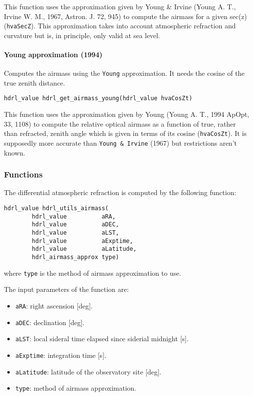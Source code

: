 This function uses the approximation given by Young \& Irvine (Young A. T., Irvine W. M., 1967, Astron. J. 72, 945) to compute the airmass for a given sec(z) (\verb+hvaSecZ+). 
This approximation takes into account atmospheric refraction and curvature but is, in principle, only valid at sea level.
  
  
\paragraph{Young approximation (1994)}

Computes the airmass using the \verb+Young+ approximation. It needs the cosine of the true zenith distance.

\begin{lstlisting}
hdrl_value hdrl_get_airmass_young(hdrl_value hvaCosZt)
\end{lstlisting}

This function uses the approximation given by Young (Young A. T., 1994 ApOpt, 33, 1108) to compute the relative optical airmass as a function of true, rather than refracted, 
zenith angle which is given in terms of its cosine (\verb+hvaCosZt+). It is supposedly more accurate than \verb+Young & Irvine+ (1967) but restrictions aren't known.


\subsubsection{Functions}
\label{sec:algorithms:airmass:inputs}

The differential atmospheric refraction is computed by the following function:

\begin{lstlisting}
hdrl_value hdrl_utils_airmass(
        hdrl_value          aRA, 
        hdrl_value          aDEC, 
        hdrl_value          aLST,
        hdrl_value          aExptime, 
        hdrl_value          aLatitude,
        hdrl_airmass_approx type)
\end{lstlisting}
where \verb+type+ is the method of airmass approximation to use.

The input parameters of the function are:
\begin{itemize}
  \item \verb+aRA+: right ascension [deg].
  \item \verb+aDEC+: declination [deg].
  \item \verb+aLST+: local sideral time elapsed since siderial midnight [s].
  \item \verb+aExptime+: integration time [s].
  \item \verb+aLatitude+: latitude of the observatory site [deg].
  \item \verb+type+: method of airmass approximation.
\end{itemize}

